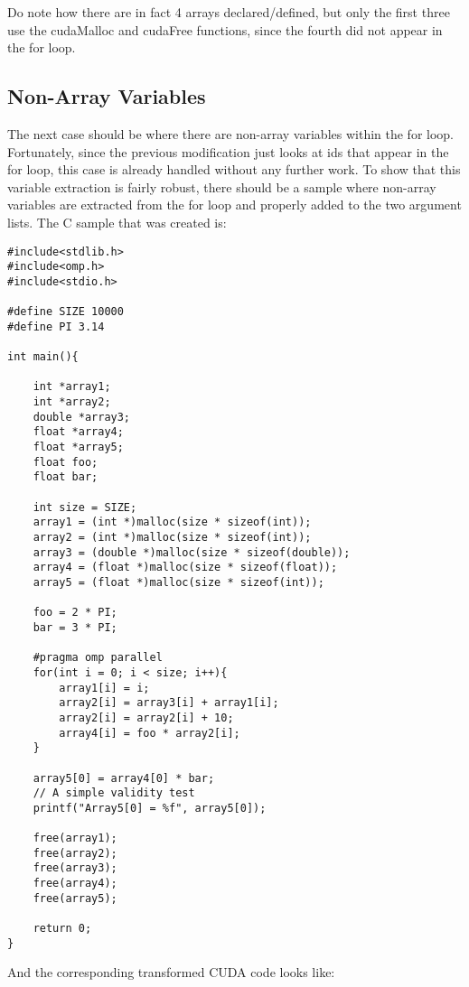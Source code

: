 \documentclass{article}
\begin{document}
Do note how there are in fact 4 arrays declared/defined, but only the first three use the cudaMalloc and cudaFree functions, since the fourth did not appear in the for loop.

\subsection{Non-Array Variables}
The next case should be where there are non-array variables within the for loop. Fortunately, since the previous modification just looks at ids that appear in the for loop, this case is already handled without any further work. To show that this variable extraction is fairly robust, there should be a sample where non-array variables are extracted from the for loop and properly added to the two argument lists. The C sample that was created is:

\begin{lstlisting}
#include<stdlib.h>
#include<omp.h>
#include<stdio.h>

#define SIZE 10000
#define PI 3.14

int main(){

	int *array1;
	int *array2;
    double *array3;
	float *array4;
	float *array5;
	float foo;
	float bar;

	int size = SIZE;
	array1 = (int *)malloc(size * sizeof(int));
	array2 = (int *)malloc(size * sizeof(int));
	array3 = (double *)malloc(size * sizeof(double));
	array4 = (float *)malloc(size * sizeof(float));
	array5 = (float *)malloc(size * sizeof(int));	

	foo = 2 * PI;
	bar = 3 * PI;

	#pragma omp parallel
	for(int i = 0; i < size; i++){
		array1[i] = i;
        array2[i] = array3[i] + array1[i];
        array2[i] = array2[i] + 10;
		array4[i] = foo * array2[i];
	}
	
	array5[0] = array4[0] * bar;
	// A simple validity test
	printf("Array5[0] = %f", array5[0]);

	free(array1);
    free(array2);
    free(array3);
	free(array4);
	free(array5);

	return 0;
}
\end{lstlisting}

And the corresponding transformed CUDA code looks like:
\end{document}
